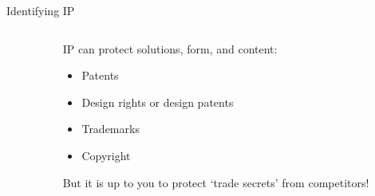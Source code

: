\begin{frame}{Identifying IP}

\begin{columns}[c]

    \begin{column}{0.45\textwidth}
        {%
\setlength{\fboxsep}{0pt}%
\setlength{\fboxrule}{1pt}%
%
        }%
    \end{column}

    \begin{column}{0.45\textwidth}
    IP can protect solutions, form, and content:
    \begin{itemize}
        \item Patents
        \item Design rights or design patents
        \item Trademarks
        \item Copyright
    \end{itemize}
    
    But it is up to you to protect `trade secrets' from competitors!
    
    \end{column}

\end{columns}

\end{frame}

